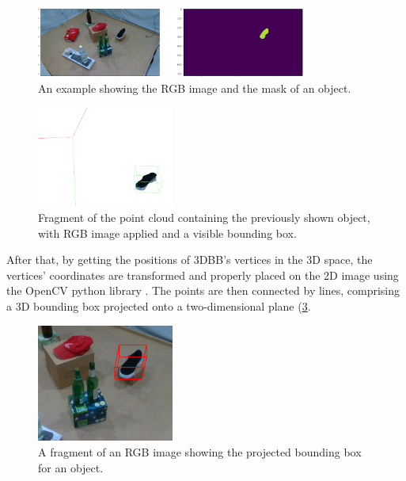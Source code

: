 \begin{figure}[ht]
    \centering
    \includegraphics[width=0.8\textwidth]{img/mask.png}
    \caption{An example showing the RGB image and the mask of an object.}
    \label{fig:3dbb-mask}
\end{figure}

\begin{figure}[ht]
    \centering
    \includegraphics[width=0.4\textwidth]{img/pcloud-cutout.png}
    \caption{Fragment of the point cloud containing the previously shown object, with RGB image applied and a visible bounding box.}
    \label{fig:pcloud-cutout}
\end{figure}

After that, by getting the positions of 3DBB's vertices in the 3D space, the vertices' coordinates are transformed and properly placed on the 2D image using the OpenCV python library \cite{opencv_library}. The points are then connected by lines, comprising a 3D bounding box projected onto a two-dimensional plane (\cref{fig:pbbox-example}.

\begin{figure}[ht]
    \centering
    \includegraphics[width=0.4\textwidth]{img/bbox-example.png}
    \caption{A fragment of an RGB image showing the projected bounding box for an object.}
    \label{fig:pbbox-example}
\end{figure}

